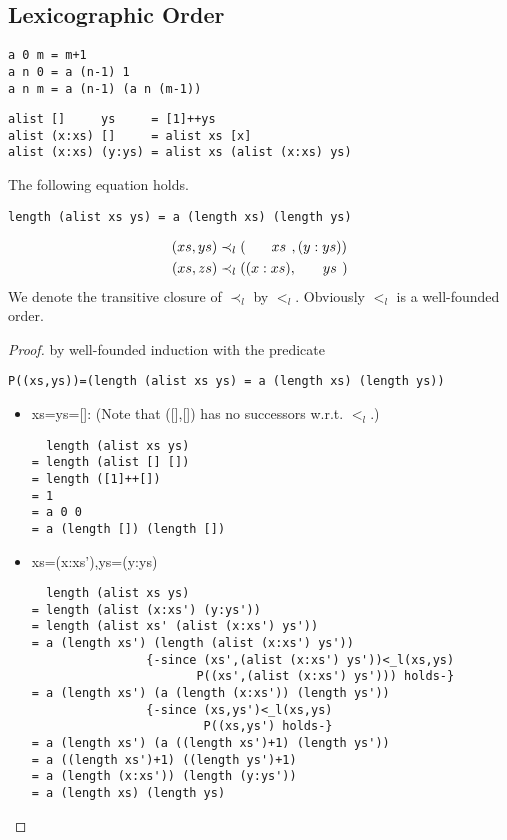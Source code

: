 \subsection{Lexicographic Order}
\begin{verbatim}
a 0 m = m+1
a n 0 = a (n-1) 1
a n m = a (n-1) (a n (m-1))
\end{verbatim}
\begin{verbatim}
alist []     ys     = [1]++ys
alist (x:xs) []     = alist xs [x]
alist (x:xs) (y:ys) = alist xs (alist (x:xs) ys)
\end{verbatim}
\begin{claim}The following equation holds.
\begin{verbatim}
length (alist xs ys) = a (length xs) (length ys)
\end{verbatim}
\end{claim}
\begin{align*}
(xs,ys)&\prec_l(\hphantom{(x:\ }xs\hphantom{)},(y:ys))\\
(xs,zs)&\prec_l((x:xs),\hphantom{(x:\ }ys\hphantom{)})
\end{align*}
We denote the transitive closure of $\prec_l$ by $<_l$. Obviously $<_l$ is a well-founded order.
\begin{proof} by well-founded induction with the predicate 
\begin{verbatim}
P((xs,ys))=(length (alist xs ys) = a (length xs) (length ys))
\end{verbatim}
\begin{itemize}
\item[] xs=ys=[]: (Note that ([],[]) has no successors w.r.t. $<_l$.)
\begin{verbatim}
  length (alist xs ys)
= length (alist [] [])
= length ([1]++[])
= 1
= a 0 0
= a (length []) (length [])
\end{verbatim}
\item[] xs=(x:xs'),ys=(y:ys)
\begin{verbatim}
  length (alist xs ys)
= length (alist (x:xs') (y:ys')) 
= length (alist xs' (alist (x:xs') ys'))
= a (length xs') (length (alist (x:xs') ys')) 
                {-since (xs',(alist (x:xs') ys'))<_l(xs,ys) 
                       P((xs',(alist (x:xs') ys'))) holds-}
= a (length xs') (a (length (x:xs')) (length ys'))
                {-since (xs,ys')<_l(xs,ys) 
                        P((xs,ys') holds-}
= a (length xs') (a ((length xs')+1) (length ys'))
= a ((length xs')+1) ((length ys')+1)
= a (length (x:xs')) (length (y:ys'))
= a (length xs) (length ys)
\end{verbatim}
\end{itemize}
\end{proof}
